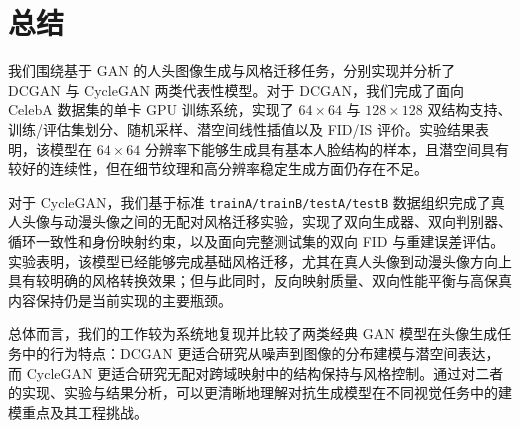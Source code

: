 \documentclass[12pt, a4paper, UTF8]{ctexart}
\begin{document}
\section{总结}

我们围绕基于 GAN 的人头图像生成与风格迁移任务，分别实现并分析了 DCGAN 与 CycleGAN 两类代表性模型。对于 DCGAN，我们完成了面向 CelebA 数据集的单卡 GPU 训练系统，实现了 $64\times64$ 与 $128\times128$ 双结构支持、训练/评估集划分、随机采样、潜空间线性插值以及 FID/IS 评价。实验结果表明，该模型在 $64\times64$ 分辨率下能够生成具有基本人脸结构的样本，且潜空间具有较好的连续性，但在细节纹理和高分辨率稳定生成方面仍存在不足。

对于 CycleGAN，我们基于标准 \texttt{trainA/trainB/testA/testB} 数据组织完成了真人头像与动漫头像之间的无配对风格迁移实验，实现了双向生成器、双向判别器、循环一致性和身份映射约束，以及面向完整测试集的双向 FID 与重建误差评估。实验表明，该模型已经能够完成基础风格迁移，尤其在真人头像到动漫头像方向上具有较明确的风格转换效果；但与此同时，反向映射质量、双向性能平衡与高保真内容保持仍是当前实现的主要瓶颈。

总体而言，我们的工作较为系统地复现并比较了两类经典 GAN 模型在头像生成任务中的行为特点：DCGAN 更适合研究从噪声到图像的分布建模与潜空间表达，而 CycleGAN 更适合研究无配对跨域映射中的结构保持与风格控制。通过对二者的实现、实验与结果分析，可以更清晰地理解对抗生成模型在不同视觉任务中的建模重点及其工程挑战。
\end{document}
